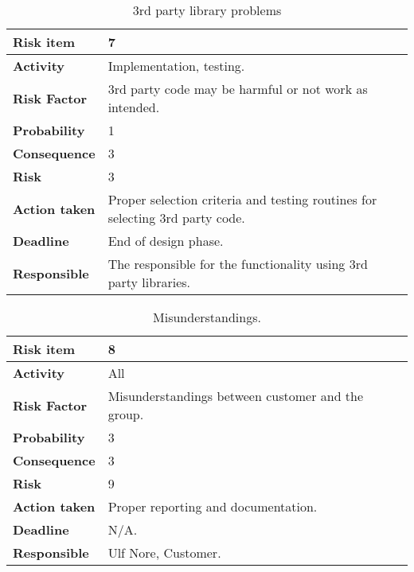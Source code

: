 \begin{table}[htdp]
\caption{3rd party library problems}
\begin{center}
\begin{tabularx}{\textwidth}{| X | X |}
\hline
\textbf{Risk item} & 7 \\
\hline
\textbf{Activity} & Implementation, testing.  \\
\hline
\textbf{Risk Factor} & 3rd party code may be harmful or not work as intended. \\
\hline
\textbf{Probability} & 1 \\
\hline
\textbf{Consequence} & 3 \\
\hline
\textbf{Risk} & 3 \\
\hline
\textbf{Action taken} & Proper selection criteria and testing routines for selecting 3rd party code. \\
\hline
\textbf{Deadline} & End of design phase. \\
\hline
\textbf{Responsible} & The responsible for the functionality using 3rd party libraries. \\
\hline
\end{tabularx}
\end{center}
\label{risk_7}
\end{table}

\begin{table}[htdp]
\caption{Misunderstandings.}
\begin{center}
\begin{tabularx}{\textwidth}{| X | X |}
\hline
\textbf{Risk item} & 8 \\
\hline
\textbf{Activity} & All  \\
\hline
\textbf{Risk Factor} & Misunderstandings between customer and the group. \\
\hline
\textbf{Probability} & 3 \\
\hline
\textbf{Consequence} & 3 \\
\hline
\textbf{Risk} & 9 \\
\hline
\textbf{Action taken} & Proper reporting and documentation. \\
\hline
\textbf{Deadline} & N/A. \\
\hline
\textbf{Responsible} & Ulf Nore, Customer. \\
\hline
\end{tabularx}
\end{center}
\label{risk_8}
\end{table}
\newpage





